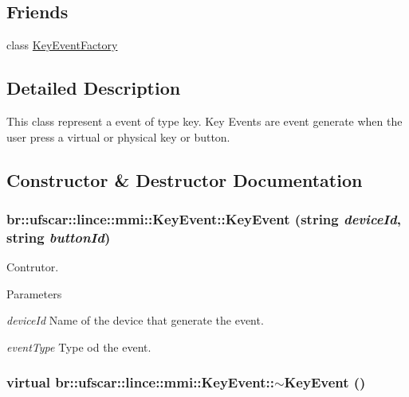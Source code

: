 \subsection*{Friends}
\begin{DoxyCompactItemize}
\item 
class \hyperlink{classbr_1_1ufscar_1_1lince_1_1mmi_1_1KeyEvent_a2dd856aac914cf1b3eca999c688da31a}{KeyEventFactory}
\end{DoxyCompactItemize}


\subsection{Detailed Description}
This class represent a event of type key. Key Events are event generate when the user press a virtual or physical key or button. 

\subsection{Constructor \& Destructor Documentation}
\hypertarget{classbr_1_1ufscar_1_1lince_1_1mmi_1_1KeyEvent_a6a6e61334c0e04dd3b43562dce2a107f}{
\subsubsection[{KeyEvent}]{\setlength{\rightskip}{0pt plus 5cm}br::ufscar::lince::mmi::KeyEvent::KeyEvent (string {\em deviceId}, \/  string {\em buttonId})}}
\label{classbr_1_1ufscar_1_1lince_1_1mmi_1_1KeyEvent_a6a6e61334c0e04dd3b43562dce2a107f}


Contrutor. 


\begin{DoxyParams}{Parameters}
\item[{\em deviceId}]Name of the device that generate the event. \item[{\em eventType}]Type od the event. \end{DoxyParams}
\hypertarget{classbr_1_1ufscar_1_1lince_1_1mmi_1_1KeyEvent_aadcb079c5602a9bc98dfdbc2f90bd500}{
\subsubsection[{$\sim$KeyEvent}]{\setlength{\rightskip}{0pt plus 5cm}virtual br::ufscar::lince::mmi::KeyEvent::$\sim$KeyEvent ()}}
\label{classbr_1_1ufscar_1_1lince_1_1mmi_1_1KeyEvent_aadcb079c5602a9bc98dfdbc2f90bd500}


